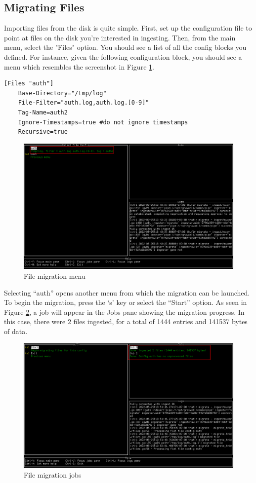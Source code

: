\subsection{Migrating Files}

Importing files from the disk is quite simple. First, set up the configuration file to point at files on the disk you're interested in ingesting. Then, from the main menu, select the "Files" option. You should see a list of all the  config blocks you defined. For instance, given the following configuration block, you should see a menu which resembles the screenshot in Figure \ref{fig:filemenu}.

\begin{verbatim}
[Files "auth"]
	Base-Directory="/tmp/log"
	File-Filter="auth.log,auth.log.[0-9]"
	Tag-Name=auth2
	Ignore-Timestamps=true #do not ignore timestamps
	Recursive=true
\end{verbatim}

\begin{figure}
	\includegraphics[width=0.95\linewidth]{images/filemenu.png}
	\caption{File migration menu}
	\label{fig:filemenu}
\end{figure}

Selecting ``auth'' opens another menu from which the migration can be launched. To begin the migration, press the `s' key or select the ``Start'' option. As seen in Figure \ref{fig:filejob}, a job will appear in the Jobs pane showing the migration progress. In this case, there were 2 files ingested, for a total of 1444 entries and 141537 bytes of data. 

\begin{figure}
	\includegraphics[width=0.95\linewidth]{images/filejob.png}
	\caption{File migration jobs}
	\label{fig:filejob}
\end{figure}

